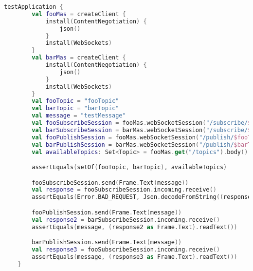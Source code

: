 \begin{lstlisting}[caption={Classe di test \texttt{BrokerBehaviorSpec}.}, label={lst:BrokerBehaviorSpec}, language=Kotlin]
    testApplication {
        val fooMas = createClient {
            install(ContentNegotiation) {
                json()
            }
            install(WebSockets)
        }
        val barMas = createClient {
            install(ContentNegotiation) {
                json()
            }
            install(WebSockets)
        }
        val fooTopic = "fooTopic"
        val barTopic = "barTopic"
        val message = "testMessage"
        val fooSubscribeSession = fooMas.webSocketSession("/subscribe/$barTopic")
        val barSubscribeSession = barMas.webSocketSession("/subscribe/$fooTopic")
        val fooPublishSession = fooMas.webSocketSession("/publish/$fooTopic")
        val barPublishSession = barMas.webSocketSession("/publish/$barTopic")
        val availableTopics: Set<Topic> = fooMas.get("/topics").body()

        assertEquals(setOf(fooTopic, barTopic), availableTopics)

        fooSubscribeSession.send(Frame.Text(message))
        val response = fooSubscribeSession.incoming.receive()
        assertEquals(Error.BAD_REQUEST, Json.decodeFromString((response as Frame.Text).readText()))

        fooPublishSession.send(Frame.Text(message))
        val response2 = barSubscribeSession.incoming.receive()
        assertEquals(message, (response2 as Frame.Text).readText())

        barPublishSession.send(Frame.Text(message))
        val response3 = fooSubscribeSession.incoming.receive()
        assertEquals(message, (response3 as Frame.Text).readText())
    }
\end{lstlisting}
